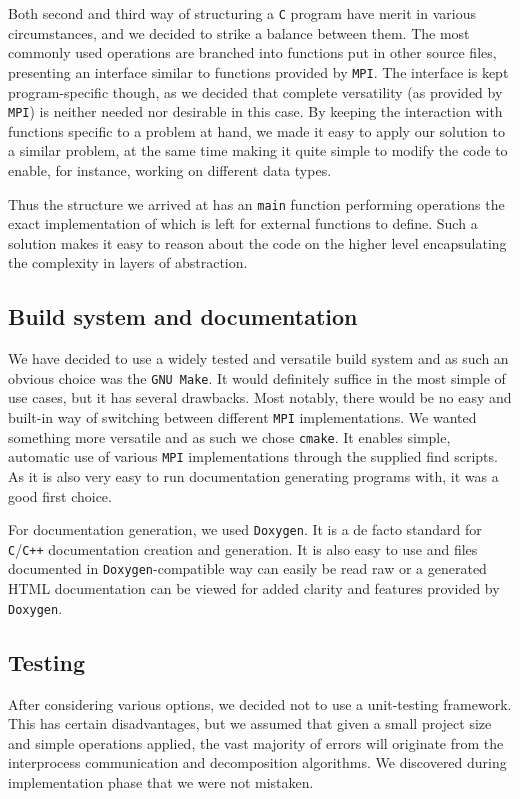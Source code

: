 \documentclass[11pt,a4paper]{article}
\begin{document}
Both second and third way of structuring a \texttt{C} program have merit in various circumstances, and we decided to strike a balance between them. 
The most commonly used operations are branched into functions put in other source files, presenting an interface similar to functions provided by \texttt{MPI}.
The interface is kept program-specific though, as we decided that complete versatility (as provided by \texttt{MPI}) is neither needed nor desirable in this case. 
By keeping the interaction with functions specific to a problem at hand, we made it easy to apply our solution to a similar problem, at the same time making it quite simple to modify the code to enable, for instance, working on different data types.

Thus the structure we arrived at has an \texttt{main} function performing operations the exact implementation of which is left for external functions to define. Such a solution makes it easy to reason about the code on the higher level encapsulating the complexity in layers of abstraction.

\subsection{Build system and documentation}
We have decided to use a widely tested and versatile build system and as such an obvious choice was the \texttt{GNU Make}. 
It would definitely suffice in the most simple of use cases, but it has several drawbacks. 
Most notably, there would be no easy and built-in way of switching between different \texttt{MPI} implementations. 
We wanted something more versatile and as such we chose \texttt{cmake}. It enables simple, automatic use of various \texttt{MPI} implementations through the supplied find scripts. As it is also very easy to run documentation generating programs with, it was a good first choice.

For documentation generation, we used \texttt{Doxygen}. It is a de facto standard for \texttt{C}/\texttt{C++} documentation creation and generation. It is also easy to use and files documented in \texttt{Doxygen}-compatible way can easily be read raw or a generated HTML documentation can be viewed for added clarity and features provided by \texttt{Doxygen}.
\subsection{Testing}
After considering various options, we decided not to use a unit-testing framework. This has certain disadvantages, but we assumed that given a small project size and simple operations applied, the vast majority of errors will originate from the interprocess communication and decomposition algorithms. We discovered during implementation phase that we were not mistaken. 
\end{document}
